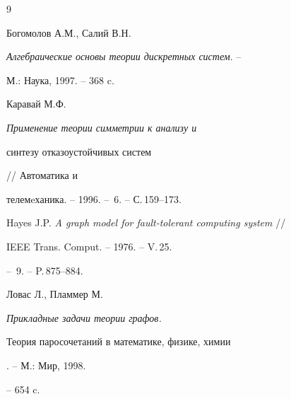 \begin{thebibliography}{9}







Богомолов А.М., Салий В.Н. 


{\em Алгебраические основы теории дискретных систем}. --


М.: Наука, 1997. -- 368 c.




Каравай М.Ф. {\em Применение теории симметрии к анализу и 


синтезу отказоустойчивых систем} // Автоматика и 


телемeханика. -- 1996. -- \No\,6. -- С.\,159--173.




Hayes J.P. {\em A graph model for fault-tolerant computing system} // 


IEEE Trans. Comput. -- 1976. -- V.\,25. 


-- \No\,9. -- P.\,875--884.




Ловас Л., Пламмер М. {\em Прикладные задачи теории графов. 


Теория паросочетаний в математике, физике, химии}. -- М.: Мир, 1998.


-- 654 c.





\end{thebibliography}





\vskip 2cm














\label{end}





